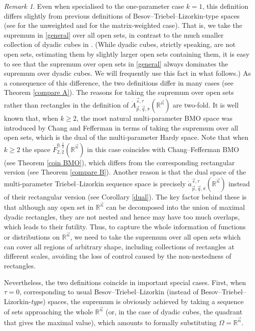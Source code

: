 \documentclass[11pt, reqno]{amsart}
\theoremstyle{definition}
\theoremstyle{remark}
\newtheorem{remark}[theorem]{Remark}
\numberwithin{equation}{section}
\newcommand{\R}{\mathbb R}
\newcommand{\vn}{\vec n}
\newcommand{\vp}{\vec p}
\newcommand{\vq}{\vec q}
\newcommand{\vs}{\vec s}
\newcommand{\Atau}{\dot A^{\vs,\tau}_{\vp,\vq,\pi}}
\newcommand{\atau}{\dot a^{\vs,\tau}_{\vp,\vq,\pi}}
\begin{document}
\begin{remark}\label{open vs D}
Even when specialised to the one-parameter case $k=1$,
this definition differs slightly from previous definitions of
Besov--Triebel--Lizorkin-type spaces (see \cite{YY08,YY10,YSY10} for the unweighted and \cite{BHYY:1a} for the matrix-weighted case).
That is, we take the supremum in \eqref{general} over all open sets, in contrast to the much smaller collection of dyadic cubes in \cite{BHYY:1a,YY08,YY10,YSY10}.
(While dyadic cubes, strictly speaking, are not open sets, estimating them by slightly larger open sets containing them, it is easy to see that the supremum over open sets in \eqref{general} always dominates the supremum over dyadic cubes. We will frequently use this fact in what follows.)
As a consequence of this difference, the two definitions differ in many
cases (see Theorem \ref{compare A}).
The reasons for taking the supremum over open sets
rather than rectangles in the definition of $\Atau(\R^{\vn})$ are two-fold.
It is well known that, when $k\geq 2$, the most natural multi-parameter BMO space
was introduced by Chang and Fefferman \cite{CF80} in terms of
taking the supremum over all open sets, which is the dual
of the multi-parameter Hardy space.
Note that when $k\geq 2$ the space $\dot F^{0,\frac12}_{2,2}(\R^{\vn})$ in this case coincides with
Chang--Fefferman BMO (see Theorem \ref{coin BMO}), which differs from the corresponding
rectangular version (see Theorem \ref{compare B}).
Another reason is that the dual space of the multi-parameter
Triebel--Lizorkin sequence space is precisely $\atau(\R^{\vn})$
instead of their rectangular version (see Corollary \ref{dual}).
The key factor behind these is that although any open set in
$\R^{\vn}$ can be decomposed into the union of maximal dyadic
rectangles, they are not nested and hence may have too much
overlaps, which leads to their futility.
Thus, to capture the whole information of functions or distributions
on $\R^{\vn}$, we need to take the supremum over all open sets
which can cover all regions of arbitrary shape,
including collections of rectangles at
different scales, avoiding the loss
of control caused by the non-nestedness of rectangles.

Nevertheless, the two definitions coincide in important special cases. First, when $\tau=0$, corresponding to usual Besov--Triebel--Lizorkin (instead of Besov--Triebel--Lizorkin-\emph{type}) spaces, the supremum is obviously achieved by taking a sequence of sets approaching the whole $\R^{\vn}$ (or, in the case of dyadic cubes, the quadrant that gives the maximal value), which amounts to formally substituting $\Omega=\R^{\vn}$.


\end{remark}
\end{document}

